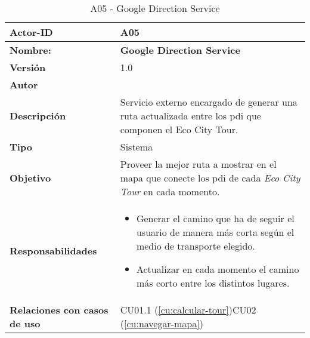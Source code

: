 \begin{table}[H]
	\centering

	\begin{tabularx}{\linewidth}{ p{} p{} }
		\toprule
		\textbf{Actor-ID}    & A05 \\
		\toprule
		\textbf{Nombre: } 			  & \textbf{Google Direction Service} \\
		\textbf{Versión}              & 1.0    \\
		\textbf{Autor}                & \autor \\
		\textbf{Descripción}          & Servicio externo encargado de generar una ruta actualizada entre los \acrshort{pdi} que componen el Eco City Tour. \\
		\textbf{Tipo}                 & Sistema \\
		\textbf{Objetivo}             & Proveer la mejor ruta a mostrar en el mapa que conecte los \acrshort{pdi} de cada \textit{Eco City Tour} en cada momento. \\
		\textbf{Responsabilidades}    & 
		\begin{itemize}
			\tightlist
			\item Generar el camino que ha de seguir el usuario de manera más corta según el medio de transporte elegido.
			\item Actualizar en cada momento el camino más corto entre los distintos lugares.
		\end{itemize}\\
		\textbf{Relaciones con casos de uso} & CU01.1 (\ref{cu:calcular-tour})CU02 (\ref{cu:navegar-mapa}) \\
		\bottomrule
	\end{tabularx}
	\caption{A05 - Google Direction Service}
	\label{actor:google-directions}
\end{table}


